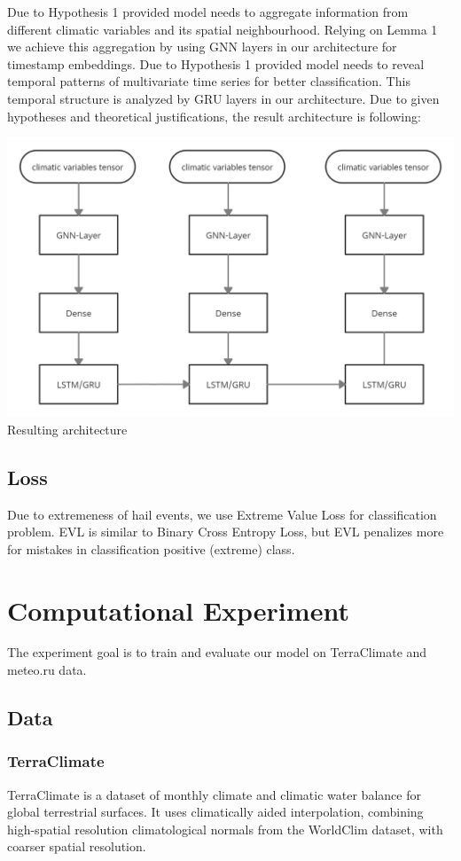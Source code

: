 \documentclass{article}
\begin{document}
Due to Hypothesis 1 provided model needs to aggregate information from different climatic variables and its spatial neighbourhood. Relying on Lemma 1 we achieve this aggregation by using GNN layers in our architecture for timestamp embeddings. Due to Hypothesis 1 provided model needs to reveal temporal patterns of multivariate time series for better classification. This temporal structure is analyzed by GRU layers in our architecture. Due to given hypotheses and theoretical justifications, the result architecture is following:
\begin{center}
    \includegraphics[scale=0.19]{figures/HailNet architecture (1).png} \\ Resulting architecture
\end{center}

\subsection{Loss}
Due to extremeness of hail events, we use Extreme Value Loss \cite{10.1145/3292500.3330896} for classification problem. EVL is similar to Binary Cross Entropy Loss, but EVL penalizes more for mistakes in classification positive (extreme) class.


\section{Computational Experiment}
The experiment goal is to train and evaluate our model on TerraClimate and meteo.ru data.
\subsection{Data}
\subsubsection{TerraClimate}
TerraClimate is a dataset of monthly climate and climatic water balance for global terrestrial surfaces. It uses climatically aided interpolation, combining high-spatial resolution climatological normals from the WorldClim dataset, with coarser spatial resolution.
\end{document}
